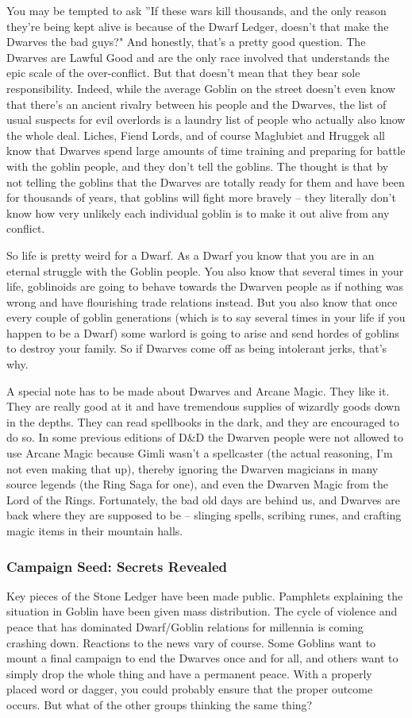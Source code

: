 You may be tempted to ask ''If these wars kill thousands, and the only reason they're being kept alive is because of the Dwarf Ledger, doesn't that make the Dwarves the bad guys?" And honestly, that's a pretty good question. The Dwarves are Lawful Good and are the only race involved that understands the epic scale of the over-conflict. But that doesn't mean that they bear sole responsibility. Indeed, while the average Goblin on the street doesn't even know that there's an ancient rivalry between his people and the Dwarves, the list of usual suspects for evil overlords is a laundry list of people who actually also know the whole deal. Liches, Fiend Lords, and of course Maglubiet and Hruggek all know that Dwarves spend large amounts of time training and preparing for battle with the goblin people, and they don't tell the goblins. The thought is that by not telling the goblins that the Dwarves are totally ready for them and have been for thousands of years, that goblins will fight more bravely -- they literally don't know how very unlikely each individual goblin is to make it out alive from any conflict.

So life is pretty weird for a Dwarf. As a Dwarf you know that you are in an eternal struggle with the Goblin people. You also know that several times in your life, goblinoids are going to behave towards the Dwarven people as if nothing was wrong and have flourishing trade relations instead. But you also know that once every couple of goblin generations (which is to say several times in your life if you happen to be a Dwarf) some warlord is going to arise and send hordes of goblins to destroy your family. So if Dwarves come off as being intolerant jerks, that's why.

A special note has to be made about Dwarves and Arcane Magic. They like it. They are really good at it and have tremendous supplies of wizardly goods down in the depths. They can read spellbooks in the dark, and they are encouraged to do so. In some previous editions of D\&D the Dwarven people were not allowed to use Arcane Magic because Gimli wasn't a spellcaster (the actual reasoning, I'm not even making that up), thereby ignoring the Dwarven magicians in many source legends (the Ring Saga for one), and even the Dwarven Magic from the Lord of the Rings. Fortunately, the bad old days are behind us, and Dwarves are back where they are supposed to be -- slinging spells, scribing runes, and crafting magic items in their mountain halls.

\subsubsection{Campaign Seed: Secrets Revealed}
Key pieces of the Stone Ledger have been made public. Pamphlets explaining the situation in Goblin have been given mass distribution. The cycle of violence and peace that has dominated Dwarf/Goblin relations for millennia is coming crashing down. Reactions to the news vary of course. Some Goblins want to mount a final campaign to end the Dwarves once and for all, and others want to simply drop the whole thing and have a permanent peace. With a properly placed word or dagger, you could probably ensure that the proper outcome occurs. But what of the other groups thinking the same thing?

